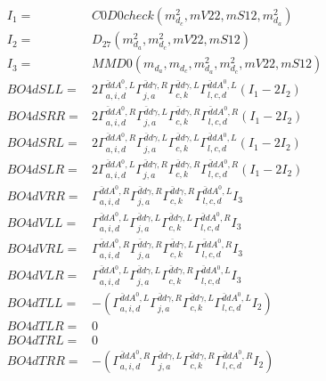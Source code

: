 \documentclass[A4,landscape]{article}
\begin{document}
\begin{align} 
I_1 = & C0D0check(m^2_{d_{{c}}}, mV22, mS12, m^2_{d_{{a}}}) \\ 
I_2 = & D_{27}(m^2_{d_{{a}}}, m^2_{d_{{c}}}, mV22, mS12) \\ 
I_3 = & MMD0(m_{d_{{a}}}, m_{d_{{c}}}, m^2_{d_{{a}}}, m^2_{d_{{c}}}, mV22, mS12) \\ 
  BO4dSLL= & 2  \Gamma^{\bar{d}d A^0 ,L}_{a, i, d} \Gamma^{\bar{d}d \gamma ,R}_{j, a} \Gamma^{\bar{d}d \gamma ,L}_{c, k} \Gamma^{\bar{d}d A^0 ,L}_{l, c, d} (I_1 - 2 I_2) \\ 
  BO4dSRR= & 2  \Gamma^{\bar{d}d A^0 ,R}_{a, i, d} \Gamma^{\bar{d}d \gamma ,L}_{j, a} \Gamma^{\bar{d}d \gamma ,R}_{c, k} \Gamma^{\bar{d}d A^0 ,R}_{l, c, d} (I_1 - 2 I_2) \\ 
  BO4dSRL= & 2  \Gamma^{\bar{d}d A^0 ,R}_{a, i, d} \Gamma^{\bar{d}d \gamma ,L}_{j, a} \Gamma^{\bar{d}d \gamma ,L}_{c, k} \Gamma^{\bar{d}d A^0 ,L}_{l, c, d} (I_1 - 2 I_2) \\ 
  BO4dSLR= & 2  \Gamma^{\bar{d}d A^0 ,L}_{a, i, d} \Gamma^{\bar{d}d \gamma ,R}_{j, a} \Gamma^{\bar{d}d \gamma ,R}_{c, k} \Gamma^{\bar{d}d A^0 ,R}_{l, c, d} (I_1 - 2 I_2) \\ 
  BO4dVRR= &  \Gamma^{\bar{d}d A^0 ,R}_{a, i, d} \Gamma^{\bar{d}d \gamma ,R}_{j, a} \Gamma^{\bar{d}d \gamma ,R}_{c, k} \Gamma^{\bar{d}d A^0 ,L}_{l, c, d} I_3 \\ 
  BO4dVLL= &  \Gamma^{\bar{d}d A^0 ,L}_{a, i, d} \Gamma^{\bar{d}d \gamma ,L}_{j, a} \Gamma^{\bar{d}d \gamma ,L}_{c, k} \Gamma^{\bar{d}d A^0 ,R}_{l, c, d} I_3 \\ 
  BO4dVRL= &  \Gamma^{\bar{d}d A^0 ,R}_{a, i, d} \Gamma^{\bar{d}d \gamma ,R}_{j, a} \Gamma^{\bar{d}d \gamma ,L}_{c, k} \Gamma^{\bar{d}d A^0 ,R}_{l, c, d} I_3 \\ 
  BO4dVLR= &  \Gamma^{\bar{d}d A^0 ,L}_{a, i, d} \Gamma^{\bar{d}d \gamma ,L}_{j, a} \Gamma^{\bar{d}d \gamma ,R}_{c, k} \Gamma^{\bar{d}d A^0 ,L}_{l, c, d} I_3 \\ 
  BO4dTLL= & -( \Gamma^{\bar{d}d A^0 ,L}_{a, i, d} \Gamma^{\bar{d}d \gamma ,R}_{j, a} \Gamma^{\bar{d}d \gamma ,L}_{c, k} \Gamma^{\bar{d}d A^0 ,L}_{l, c, d} I_2) \\ 
  BO4dTLR= & 0 \\ 
  BO4dTRL= & 0 \\ 
  BO4dTRR= & -( \Gamma^{\bar{d}d A^0 ,R}_{a, i, d} \Gamma^{\bar{d}d \gamma ,L}_{j, a} \Gamma^{\bar{d}d \gamma ,R}_{c, k} \Gamma^{\bar{d}d A^0 ,R}_{l, c, d} I_2) \\ 
\end{align} 
\end{document}
